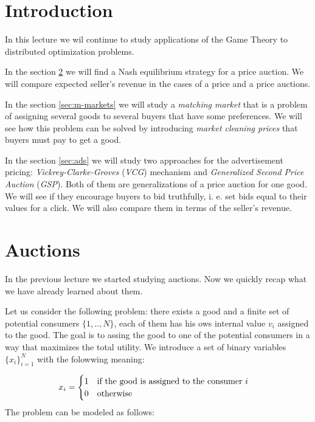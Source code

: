 
\usepackage[super]{nth} 







\section{Introduction}

In this lecture we wil continue to study applications of the Game Theory to distributed optimization problems.

In the section \ref{sec:auctions} we will find a Nash equilibrium strategy for a  price auction. We will compare expected seller's revenue in the cases of a  price and a  price auctions.

In the section \ref{sec:m-markets} we will study a \textit{matching market} that is a problem of assigning several goods to several buyers that have some preferences. We will see how this problem can be solved by introducing \textit{market cleaning prices} that buyers must pay to get a good.

In the section \ref{sec:ads} we will study two approaches for the advertisement pricing: \textit{Vickrey-Clarke-Groves} (\textit{VCG}) mechanism and \textit{Generalized Second Price Auction} (\textit{GSP}). Both of them are generalizations of a  price auction for one good. We will see if they encourage buyers to bid truthfully, i. e. set bids equal to their values for a click. We will also compare them in terms of the seller's revenue.

\section{Auctions}\label{sec:auctions}

In the previous lecture we started studying auctions. Now we quickly recap what we have already learned about them.

Let us consider the following problem: there exists a good and a finite set of potential consumers $\{1,..,N\}$, each of them has his ows internal value $v_i$ assigned to the good. The goal is to assing the good to one of the potential consumers in a way that maximizes the total utility. We introduce a set of binary variables $\{x_i\}_{i=1}^N$ with the folowwing meaning:

\begin{equation}
\begin{aligned}
& x_i = 
	\begin{cases}
	1 \hfill & \text{if the good is assigned to the consumer } i\\
	0 \hfill & \text{otherwise}
	\end{cases}
\end{aligned}
\end{equation}
 The problem can be modeled as follows:

